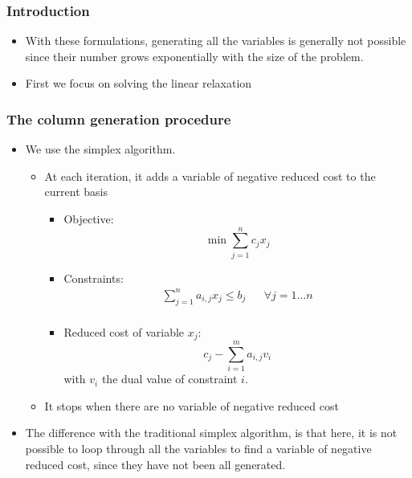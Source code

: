 \documentclass[10pt]{beamer}
\begin{document}
\begin{frame}
  \frametitle{Introduction}
  
  \begin{itemize}
    \item With these formulations, generating all the variables is generally not possible since their number grows exponentially with the size of the problem.
    \item First we focus on solving the \alert{linear relaxation}
  \end{itemize}
\end{frame}

\begin{frame}
  \frametitle{The column generation procedure}
  
  \begin{itemize}
    \item We use the \alert{simplex algorithm}.
      \begin{itemize}
        \item At each iteration, it adds a variable of negative reduced cost to the current basis
        \begin{itemize}
          \item Objective:
            \begin{displaymath}
              \min \sum_{j = 1}^n c_j x_j
            \end{displaymath}
          \item Constraints:
          \begin{align*}
            \sum_{j = 1}^n a_{i, j} x_j \le b_j && \forall j = 1 \dots n \\
          \end{align*}
          \item Reduced cost of variable $x_j$:
            \begin{displaymath}
              c_j - \sum_{i = 1}^m a_{i, j} v_i
            \end{displaymath}
            with $v_i$ the dual value of constraint $i$.
        \end{itemize}
        \item It stops when there are no variable of negative reduced cost
      \end{itemize}
    \item The difference with the traditional simplex algorithm, is that here, it is not possible to loop through all the variables to find a variable of negative reduced cost, since they have not been all generated.
  \end{itemize}
\end{frame}
\end{document}
